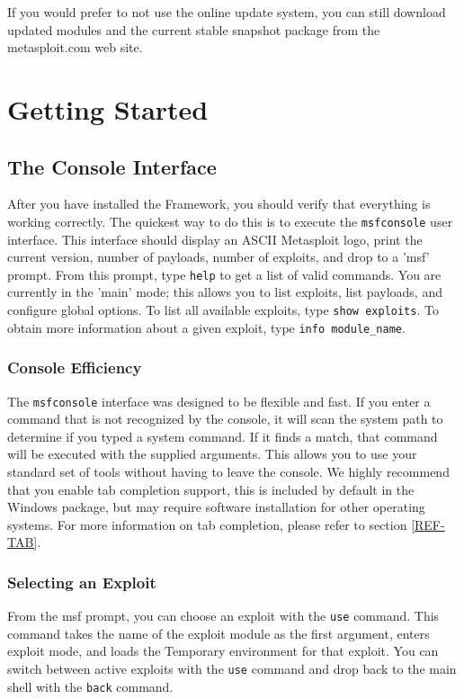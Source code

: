 \documentclass{report}
\begin{document}
\par
If you would prefer to not use the online update system, you can still download
updated modules and the current stable snapshot package from the metasploit.com
web site. 
\pagebreak


\chapter{Getting Started}

    \section{The Console Interface}
    \label{STARTED-CONSOLE}
\par
After you have installed the Framework, you should verify that everything is
working correctly.  The quickest way to do this is to execute the
\texttt{msfconsole} user interface. This interface should display an ASCII Metasploit
logo, print the current version, number of payloads, number of exploits, and
drop to a 'msf' prompt. From this prompt, type \texttt{help} to get a list of
valid commands. You are currently in the 'main' mode; this allows you to list
exploits, list payloads, and configure global options.  To list all available
exploits, type \texttt{show exploits}. To obtain more information about a given
exploit, type \texttt{info module\_name}. 


    \subsection{Console Efficiency}
    \label{CONSOLE-EFF}
\par
The \texttt{msfconsole} interface was designed to be flexible and fast. If you
enter a command that is not recognized by the console, it will scan the system
path to determine if you typed a system command. If it finds a match, that
command will be executed with the supplied arguments. This allows you to use
your standard set of tools without having to leave the console. We highly
recommend that you enable tab completion support, this is included by default in
the Windows package, but may require software installation for other operating
systems. For more information on tab completion, please refer to section
\ref{REF-TAB}.



    \subsection{Selecting an Exploit}
    \label{CONSOLE-SEL}
\par
From the msf prompt, you can choose an exploit with the \texttt{use} command.
This command takes the name of the exploit module as the first argument, enters
exploit mode, and loads the Temporary environment for that exploit. You can
switch between active exploits with the \texttt{use} command and drop back to
the main shell with the \texttt{back} command. 
   
\end{document}
